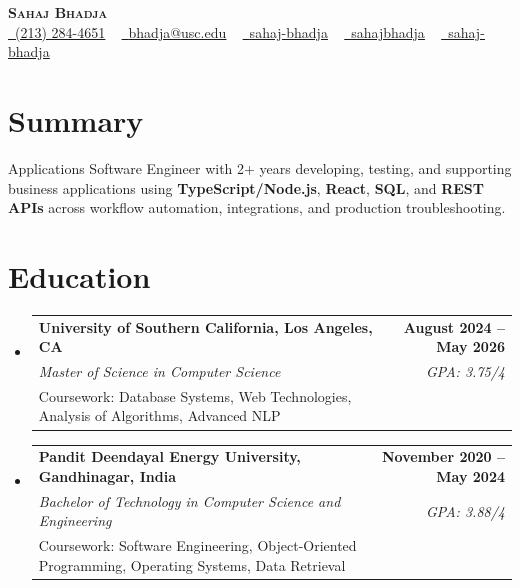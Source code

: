 \documentclass[letterpaper,10pt]{article}
\makeatletter
\newcommand{\sectionGap}{\vspace{-8pt}}
\newcommand{\resumeEduSubheading}[5]{\vspace{-1pt}\item\begin{tabular*}{1.0\textwidth}[t]{l@{\extracolsep{\fill}}r}\textbf{#1} & \textbf{\small #2} \\\textit{\small #3} & \textit{\small #4} \\\small #5 & \\\end{tabular*}\vspace{-4pt}}
\newcommand{\resumeSubHeadingListStart}{\begin{itemize}[leftmargin=0.0in, label={}]}
\newcommand{\resumeSubHeadingListEnd}{\end{itemize}}
\makeatother
\begin{document}
\begin{center}
{\Huge \scshape \textbf{Sahaj Bhadja}} \\ \vspace{1pt}
\small \href{tel:2132844651}{\faPhone\ \underline{(213) 284-4651}} ~ \href{mailto:bhadja@usc.edu}{\raisebox{-0.2\height}\faEnvelope\ \underline{bhadja@usc.edu}} ~
\href{https://www.linkedin.com/in/sahaj-bhadja/}{\raisebox{-0.2\height}\faLinkedin\ \underline{sahaj-bhadja}} ~ \href{https://github.com/SAHAJ-BHADJA}{\raisebox{-0.2\height}\faGithub\ \underline{sahajbhadja}} ~
\href{https://sahaj-bhadja.vercel.app/}{\raisebox{-0.2\height}\faGlobe\ \underline{sahaj-bhadja}}
\end{center}
\vspace{-16pt}
\section{Summary}
\begin{itemize}[leftmargin=0.15in, label={}]
\small{\item{Applications Software Engineer with 2+ years developing, testing, and supporting business applications using \textbf{TypeScript/Node.js}, \textbf{React}, \textbf{SQL}, and \textbf{REST APIs} across workflow automation, integrations, and production troubleshooting.}}
\end{itemize}
\sectionGap
\section{Education}
\resumeSubHeadingListStart
\resumeEduSubheading{University of Southern California, Los Angeles, CA}{August 2024 -- May 2026}{Master of Science in Computer Science}{GPA: 3.75/4}{Coursework: Database Systems, Web Technologies, Analysis of Algorithms, Advanced NLP}
\resumeEduSubheading{Pandit Deendayal Energy University, Gandhinagar, India}{November 2020 -- May 2024}{Bachelor of Technology in Computer Science and Engineering}{GPA: 3.88/4}{Coursework: Software Engineering, Object-Oriented Programming, Operating Systems, Data Retrieval}
\resumeSubHeadingListEnd
\sectionGap
\end{document}
